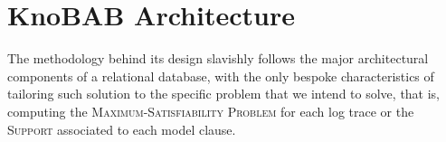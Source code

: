 \section{KnoBAB Architecture}\label{sec:karch}
The methodology behind its design slavishly follows the major architectural components of a relational database, with the only bespoke characteristics of tailoring such solution to the specific problem that we intend to solve, that is, computing the \textsc{Maximum-Satisfiability Problem} for each log trace or the \textsc{Support} associated to each model clause.

